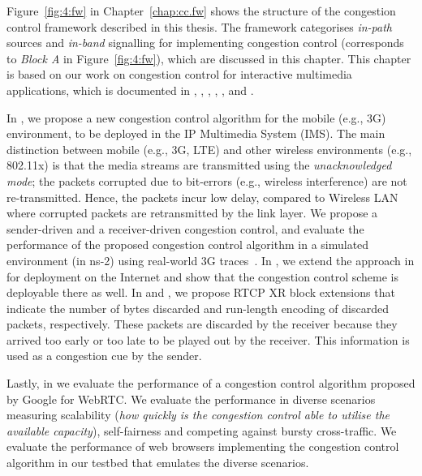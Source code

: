 Figure~\ref{fig:4:fw} in Chapter~\ref{chap:cc.fw} shows the structure of the
congestion control framework described in this thesis. The framework
categorises \emph{in-path} sources and \emph{in-band} signalling for
implementing congestion control (corresponds to \emph{Block A} in
Figure~\ref{fig:4:fw}), which are discussed in this chapter. This chapter is
based on our work on congestion control for interactive multimedia
applications, which is documented in , ,
, \cite{rfc7097},
\cite{rfc7243}, \cite{singh:2010.thesis} and
\cite{Singh:control.loops.api}.

In , we propose a new congestion control algorithm for the
mobile (e.g., 3G) environment, to be deployed in the IP Multimedia System
(IMS). The main distinction between mobile (e.g., 3G, LTE) and other wireless
environments (e.g., 802.11x) is that the media streams are transmitted using
the \emph{unacknowledged mode}; the packets corrupted due to bit-errors (e.g.,
wireless interference) are not re-transmitted. Hence, the packets incur low
delay, compared to Wireless LAN where corrupted packets are retransmitted by
the link layer. We propose a sender-driven and a receiver-driven congestion
control, and evaluate the performance of the proposed congestion control
algorithm in a simulated environment (in ns-2) using real-world 3G
traces~\cite{s4.eval.bitrate, 3gppSim}. In , we extend the
approach in  for deployment on the Internet and show that the
congestion control scheme is deployable there as well. In \cite{rfc7097} and
\cite{rfc7243}, we propose RTCP XR block extensions that
indicate the number of bytes discarded and run-length encoding of discarded
packets, respectively. These packets are discarded by the receiver because
they arrived too early or too late to be played out by the receiver. This
information is used as a congestion cue by the sender.


Lastly, in  we evaluate the performance of a congestion
control algorithm proposed by Google for WebRTC. We evaluate the performance
in diverse scenarios measuring scalability (\emph{how quickly is the
congestion control able to utilise the available capacity}), self-fairness and
competing against bursty cross-traffic. We evaluate the performance of
web browsers implementing the congestion control algorithm in our testbed that
emulates the diverse scenarios.

